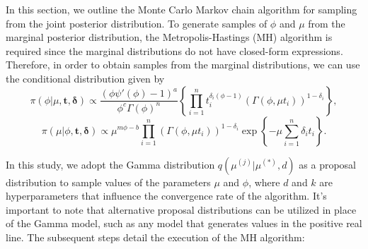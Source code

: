 \documentclass[12pt]{article} %
\theoremstyle{plain}%
\theoremstyle{definition}
\theoremstyle{remark}
\begin{document}
In this section, we outline the Monte Carlo Markov chain algorithm for sampling from the joint posterior distribution.  To generate samples of $\phi$ and $\mu$ from the marginal posterior distribution, the Metropolis-Hastings (MH) algorithm is required since the marginal distributions do not have closed-form expressions. Therefore, in order to obtain samples from the marginal distributions, we can use the conditional distribution given by 
\begin{equation}\label{cond1}
\pi(\phi|\mu,\boldsymbol{t,\delta})\propto \frac{(\phi\psi'(\phi)-1)^{a}}{\phi^{c}\Gamma(\phi)^n}\left\{\prod_{i=1}^n{t_i^{\delta_i(\phi-1)}}\left(\Gamma(\phi,\mu t_i)\right)^{1-\delta_i}\right\},
\end{equation}
\begin{equation*}%
\pi(\mu|\phi,\boldsymbol{t,\delta})\propto \mu^{m\phi-b}\prod_{i=1}^n\left(\Gamma(\phi,\mu t_i)\right)^{1-\delta_i}\exp\left\{-\mu\sum_{i=1}^n {\delta_i}t_i\right\}.
\end{equation*}


In this study, we adopt the Gamma distribution $q(\mu^{(j)}|\mu^{(*)},d)$ as a proposal distribution to sample values of the parameters $\mu$ and $\phi$, where $d$ and $k$ are hyperparameters that influence the convergence rate of the algorithm. It's important to note that alternative proposal distributions can be utilized in place of the Gamma model, such as any model that generates values in the positive real line. The subsequent steps detail the execution of the MH algorithm:
\end{document}
